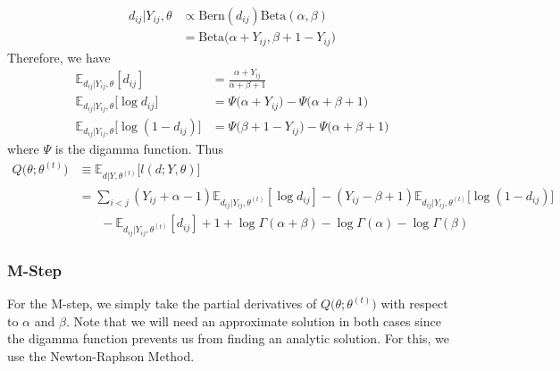 \documentclass{article}
\begin{document}
\begin{align*}
d_{ij} | Y_{ij}, \theta &\propto \text{Bern}(d_{ij})\text{Beta}(\alpha, \beta)\\
&= \text{Beta}\Big(\alpha + Y_{ij}, \beta + 1 - Y_{ij}\Big)
\end{align*}
Therefore, we have
\begin{align*}
\mathbb{E}_{d_{ij} | Y_{ij}, \theta} [d_{ij}] &= \frac{\alpha + Y_{ij}}{\alpha + \beta + 1} \\
\mathbb{E}_{d_{ij} | Y_{ij}, \theta} \big[\log d_{ij}\big] &= \Psi\Big(\alpha + Y_{ij}\Big) - \Psi\Big(\alpha + \beta + 1\Big) \\
\mathbb{E}_{d_{ij} | Y_{ij}, \theta} \big[\log (1 - d_{ij})\big] &= \Psi\Big(\beta + 1 - Y_{ij}\Big) - \Psi\Big(\alpha + \beta + 1\Big)
\end{align*}
where $\Psi$ is the digamma function. Thus
\begin{align*}
Q\big(\theta; \theta^{(t)}\big) &\equiv \mathbb{E}_{d | Y, \theta^{(t)}} \Big[l(d; Y, \theta)\Big] \\
&= \sum_{i<j} (Y_{ij} + \alpha - 1) \mathbb{E}_{d_{ij} | Y_{ij}, \theta^{(t)}} [\log  d_{ij}] - (Y_{ij} - \beta + 1) \mathbb{E}_{d_{ij} | Y_{ij}, \theta^{(t)}} \big[\log (1-d_{ij})\big] \\
&\ \ \ \ \ \ \ \ - \mathbb{E}_{d_{ij} | Y_{ij}, \theta^{(t)}} [d_{ij}] + 1 + \log \Gamma(\alpha + \beta) - \log \Gamma(\alpha) - \log \Gamma(\beta) \tag{E}
\end{align*}

\subsubsection{M-Step}

For the M-step, we simply take the partial derivatives of $Q\big(\theta; \theta^{(t)}\big)$ with respect to $\alpha$ and $\beta$. Note that we will need an approximate solution in both cases since the digamma function prevents us from finding an analytic solution. For this, we use the Newton-Raphson Method.
\end{document}
